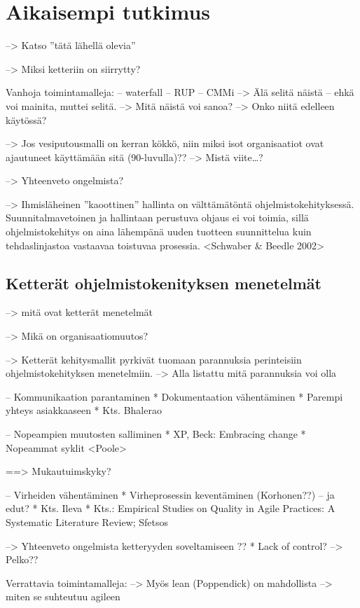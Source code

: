 \section{Aikaisempi tutkimus}
\label{sec:tausta}

--> Katso ''tätä lähellä olevia''

--> Miksi ketteriin on siirrytty?

Vanhoja toimintamalleja:
-- waterfall
-- RUP
-- CMMi
--> Älä selitä näistä -- ehkä voi mainita, muttei selitä.
--> Mitä näistä voi sanoa? --> Onko niitä edelleen käytössä?

--> Jos vesiputousmalli on kerran kökkö, niin miksi isot organisaatiot ovat
ajautuneet käyttämään sitä (90-luvulla)?? --> Mistä viite\ldots?

--> Yhteenveto ongelmista?

--> Ihmisläheinen ''kaoottinen'' hallinta on välttämätöntä ohjelmistokehityksessä.
Suunnitalmavetoinen ja hallintaan perustuva ohjaus ei voi toimia, sillä
ohjelmistokehitys on aina lähempänä uuden tuotteen suunnittelua kuin
tehdaslinjastoa vastaavaa toistuvaa prosessia. <Schwaber \& Beedle 2002>


\subsection{Ketterät ohjelmistokenityksen menetelmät}

--> mitä ovat ketterät menetelmät

--> Mikä on organisaatiomuutos?

--> Ketterät kehitysmallit pyrkivät tuomaan parannuksia perinteisiin
ohjelmistokehityksen menetelmiin. --> Alla listattu mitä parannuksia voi olla

-- Kommunikaation parantaminen
  * Dokumentaation vähentäminen
  * Parempi yhteys asiakkaaseen
  * Kts. Bhalerao

-- Nopeampien muutosten salliminen
  * XP, Beck: Embracing change
  * Nopeammat syklit <Poole>

==> Mukautuimskyky?

-- Virheiden vähentäminen
  * Virheprosessin keventäminen (Korhonen??) -- ja edut?
  * Kts. Ileva
  * Kts.: Empirical Studies on Quality in Agile Practices: A Systematic Literature Review; Sfetsos

--> Yhteenveto ongelmista ketteryyden soveltamiseen ??
  * Lack of control? --> Pelko??

Verrattavia toimintamalleja:
--> Myös lean (Poppendick) on mahdollista
--> miten se suhteutuu agileen

